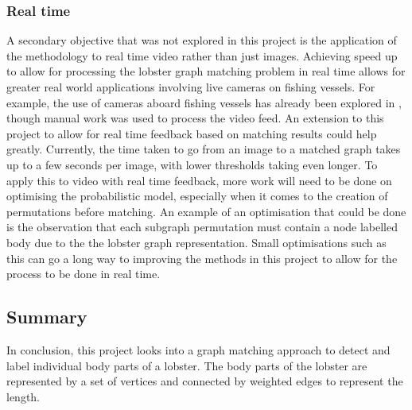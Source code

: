 \subsubsection{Real time}
A secondary objective that was not explored in this project is the application of the methodology to real time video rather than just images. Achieving speed up to allow for processing the lobster graph matching problem in real time allows for greater real world applications involving live cameras on fishing vessels. For example, the use of cameras aboard fishing vessels has already been explored in \cite{lobster-video}, though manual work was used to process the video feed. An extension to this project to allow for real time feedback based on matching results could help greatly. Currently, the time taken to go from an image to a matched graph takes up to a few seconds per image, with lower thresholds taking even longer. To apply this to video with real time feedback, more work will need to be done on optimising the probabilistic model, especially when it comes to the creation of permutations before matching. An example of an optimisation that could be done is the observation that each subgraph permutation must contain a node labelled body due to the the lobster graph representation. Small optimisations such as this can go a long way to improving the methods in this project to allow for the process to be done in real time. 

\subsection{Summary}
In conclusion, this project looks into a graph matching approach to detect and label individual body parts of a lobster. The body parts of the lobster are represented by a set of vertices and connected by weighted edges to represent the length. 

